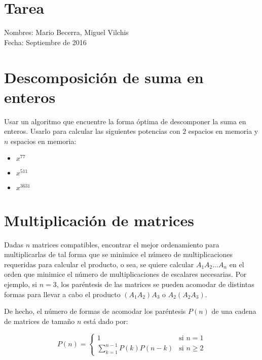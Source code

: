 \documentclass{article}
\begin{document}
\section*{Tarea}

Nombres: Mario Becerra, Miguel Vilchis \\
Fecha: Septiembre de 2016


\section{Descomposición de suma en enteros}

Usar un algoritmo que encuentre la forma óptima de descomponer la suma en enteros. Usarlo para calcular las siguientes potencias con $2$ espacios en memoria y $n$ espacios en memoria:

\begin{multicols}{3}
    \begin{itemize}
        \item $x^{77}$
        \item $x^{511}$
        \item $x^{3631}$
    \end{itemize}
    \end{multicols}


\section{Multiplicación de matrices}

Dadas $n$ matrices compatibles, encontrar el mejor ordenamiento para multiplicarlas de tal forma que se minimice el número de multiplicaciones requeridas para calcular el producto, o sea, se quiere calcular $A_1 A_2 \hdots A_n$ en el orden que minimice el número de multiplicaciones de escalares necesarias. Por ejemplo, si $n = 3$, los paréntesis de las matrices se pueden acomodar de distintas formas para llevar a cabo el producto $(A_1 A_2)A_3$ o $A_2(A_2 A_3)$.

De hecho, el número de formas de acomodar los paréntesis $P(n)$ de una cadena de matrices de tamaño $n$ está dado por:

\begin{equation*}
P(n) = \left\{
    \begin{array}{ll}
        1                          & \mbox{si } n = 1 \\
        \sum_{k=1}^{n-1}P(k)P(n-k) & \mbox{si } n \ge 2
    \end{array}
\right.
\end{equation*}
\end{document}
